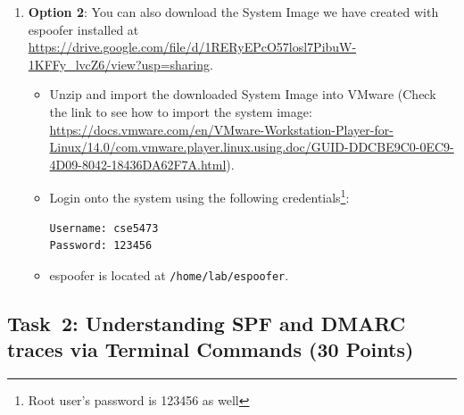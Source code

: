 \documentclass[11pt]{article}
\newcommand{\espoofer}{{\sf espoofer}\xspace}
\newcommand{\dmark}{{\sf DMARC}\xspace}
\newcommand{\spf}{{\sf SPF}\xspace}
\begin{document}
\begin{enumerate}
\item \textbf{Option 2}: You can also download the System Image we have created with \espoofer installed at \url{https://drive.google.com/file/d/1RERyEPcO57losl7PibuW-1KFFy_lvcZ6/view?usp=sharing}.
\begin{itemize}
\item Unzip and import the downloaded System Image into VMware (Check the link to see how to import the system image:  \url{https://docs.vmware.com/en/VMware-Workstation-Player-for-Linux/14.0/com.vmware.player.linux.using.doc/GUID-DDCBE9C0-0EC9-4D09-8042-18436DA62F7A.html}).
\item Login onto the system using the following credentials\footnote{Root user's password is 123456 as well}:
 \begin{lstlisting}
Username: cse5473
Password: 123456
\end{lstlisting}\vspace{-6mm}
\item \espoofer is located at \texttt{/home/lab/espoofer}.
\end{itemize}



\end{enumerate}

\subsection{Task~2: Understanding \spf and \dmark traces via Terminal Commands (30 Points)}
\end{document}
